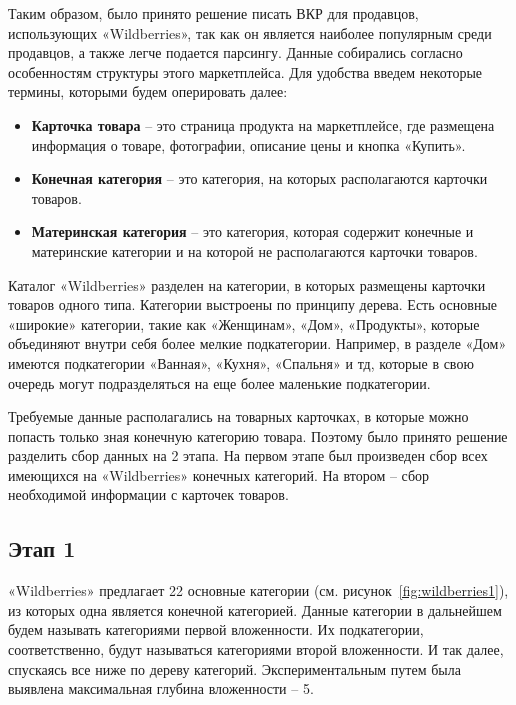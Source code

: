 \documentclass[a4paper,12pt]{extarticle}
\begin{document}
Таким образом, было принято решение писать ВКР для продавцов, использующих «Wildberries», так как он является наиболее популярным среди продавцов, а также легче подается парсингу. Данные собирались согласно особенностям структуры этого маркетплейса. Для удобства введем некоторые термины, которыми будем оперировать далее:
\begin{itemize}
	\item \textbf{Карточка товара} – это страница продукта на маркетплейсе, где размещена информация о товаре, фотографии, описание цены и кнопка «Купить».
	\item \textbf{Конечная категория} – это категория, на которых располагаются карточки товаров.
	\item \textbf{Материнская категория} – это категория, которая содержит конечные и материнские категории и на которой не располагаются карточки товаров.
\end{itemize}

Каталог «Wildberries» разделен на категории, в которых размещены карточки товаров одного типа. Категории выстроены по принципу дерева. Есть основные «широкие» категории, такие как «Женщинам», «Дом», «Продукты», которые объединяют внутри себя более мелкие подкатегории. Например, в разделе «Дом» имеются подкатегории «Ванная», «Кухня», «Спальня» и тд, которые в свою очередь могут подразделяться на еще более маленькие подкатегории. 

Требуемые данные располагались на товарных карточках, в которые можно попасть только зная конечную категорию товара. Поэтому было принято решение разделить сбор данных на 2 этапа. На первом этапе был произведен сбор всех имеющихся на «Wildberries» конечных категорий. На втором – сбор необходимой информации с карточек товаров.

\subsection{Этап 1}\label{subsection:datastep1}

«Wildberries» предлагает 22 основные категории (см. рисунок~\ref{fig:wildberries1}), из которых одна является конечной категорией. Данные категории в дальнейшем будем называть категориями первой вложенности. Их подкатегории, соответственно, будут называться категориями второй вложенности. И так далее, спускаясь все ниже по дереву категорий. Экспериментальным путем была выявлена максимальная глубина вложенности – 5.
\end{document}
